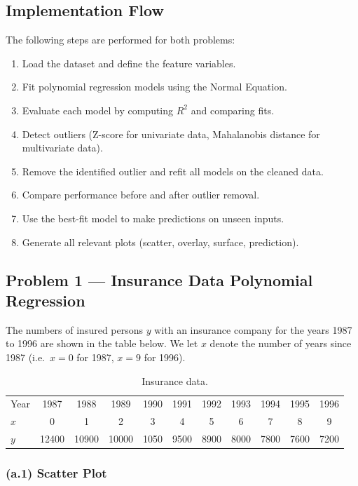 \documentclass[12pt, a4paper]{article}
\begin{document}
\subsection{Implementation Flow}
The following steps are performed for both problems:
\begin{enumerate}
    \item Load the dataset and define the feature variables.
    \item Fit polynomial regression models using the Normal Equation.
    \item Evaluate each model by computing $R^2$ and comparing fits.
    \item Detect outliers (Z-score for univariate data, Mahalanobis distance for multivariate data).
    \item Remove the identified outlier and refit all models on the cleaned data.
    \item Compare performance before and after outlier removal.
    \item Use the best-fit model to make predictions on unseen inputs.
    \item Generate all relevant plots (scatter, overlay, surface, prediction).
\end{enumerate}

\subsection{Problem 1 --- Insurance Data Polynomial Regression}

The numbers of insured persons $y$ with an insurance company for the years 1987 to 1996 are shown in the table below.  We let $x$ denote the number of years since 1987 (i.e.\ $x=0$ for 1987, $x=9$ for 1996).

\begin{table}[H]
\centering
\begin{tabular}{l|cccccccccc}
\toprule
Year & 1987 & 1988 & 1989 & 1990 & 1991 & 1992 & 1993 & 1994 & 1995 & 1996 \\
$x$  &  0   &  1   &  2   &  3   &  4   &  5   &  6   &  7   &  8   &  9   \\
\midrule
$y$  & 12400 & 10900 & 10000 & 1050 & 9500 & 8900 & 8000 & 7800 & 7600 & 7200 \\
\bottomrule
\end{tabular}
\caption{Insurance data.}
\label{tab:p1_data}
\end{table}

\subsubsection{(a.1) Scatter Plot}
\end{document}
